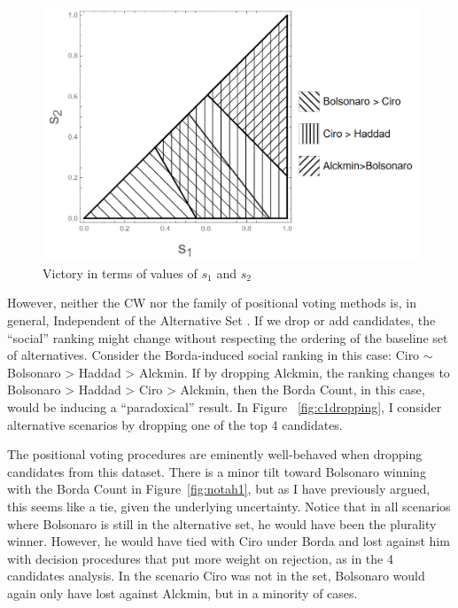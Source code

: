 \documentclass[hidelinks,11pt]{article}
\begin{document}
\begin{figure}[!h] \centering \includegraphics[width=\columnwidth,
height=0.3\textheight]{./images/counterfactual_triangle.png}
\caption{Victory in terms of values of \(s_{1}\) and \(s_{2}\)}
 \label{fig:positional4c}
\end{figure}


However, neither the CW nor the family of positional voting methods is, in
general, Independent of the Alternative Set \parencite{kaminski2015empirical}.
If we drop or add candidates, the ``social'' ranking might change without
respecting the ordering of the baseline set of alternatives. Consider the
Borda-induced social ranking in this case: Ciro \( \sim \) Bolsonaro > Haddad >
Alckmin. If by dropping Alckmin, the ranking changes to Bolsonaro > Haddad >
Ciro > Alckmin, then the Borda Count, in this case, would be inducing a
``paradoxical'' result. In Figure ~\ref{fig:c1dropping}, I consider alternative
scenarios by dropping one of the top 4 candidates.

The positional voting procedures are eminently well-behaved when dropping
candidates from this dataset. There is a minor tilt toward Bolsonaro winning
with the Borda Count in Figure~\ref{fig:notah1}, but as I have previously
argued, this seems like a tie, given the underlying uncertainty. Notice that in
all scenarios where Bolsonaro is still in the alternative set, he would have
been the plurality winner. However, he would have tied with Ciro under Borda and
lost against him with decision procedures that put more weight on rejection, as
in the 4 candidates analysis. In the scenario Ciro was not in the set, Bolsonaro
would again only have lost against Alckmin, but in a minority of cases.
\end{document}
